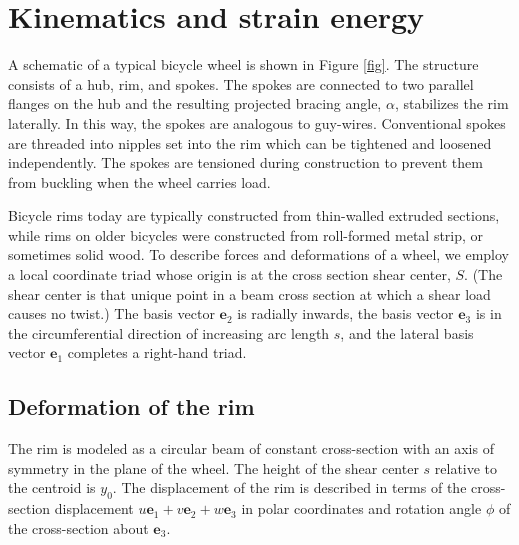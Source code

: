 \documentclass[../thesis.tex]{subfiles}
\begin{document}
\section{Kinematics and strain energy}
A schematic of a typical bicycle wheel is shown in Figure \ref{fig}. The structure consists of a hub, rim, and spokes. The spokes are connected to two parallel flanges on the hub and the resulting projected bracing angle, $\alpha$,  stabilizes the rim laterally. In this way, the spokes are analogous to guy-wires. Conventional spokes are threaded into nipples set into the rim which can be tightened and loosened independently. The spokes are tensioned during construction to prevent them from buckling when the wheel carries load.

Bicycle rims today are typically constructed from thin-walled extruded sections, while rims on older bicycles were constructed from roll-formed metal strip, or sometimes solid wood. To describe forces and deformations of a wheel, we employ a local coordinate triad whose origin is at the cross section shear center, $S$. (The shear center is that unique point in a beam cross section at which a shear load causes no twist.) The basis vector $\mathbf{e}_2$ is radially inwards, the basis vector $\mathbf{e}_3$ is in the circumferential direction of increasing arc length $s$, and the lateral basis vector $\mathbf{e}_1$ completes a right-hand triad.

\subsection{Deformation of the rim}

The rim is modeled as a circular beam of constant cross-section with an axis of symmetry in the plane of the wheel. The height of the shear center $s$ relative to the centroid is $y_0$. The displacement of the rim is described in terms of the cross-section displacement $u\mathbf{e}_1 + v\mathbf{e}_2 + w\mathbf{e}_3$ in polar coordinates and rotation angle $\phi$ of the cross-section about $\mathbf{e}_3$.
\end{document}
